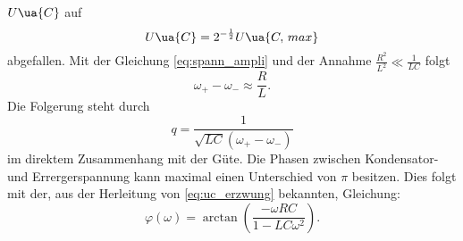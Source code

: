 $U\ua{C}$ auf
\begin{equation*}
   U\ua{C}=2^{-\frac{1}{2}} U\ua{C,\, max}
\end{equation*}
abgefallen.
Mit der Gleichung \eqref{eq:spann_ampli} und der Annahme $\frac{R^2}{L^2}\ll \frac{1}{LC}$
folgt
\begin{equation}
  \label{eq:omega_+_-}
  \omega_+-\omega_-\approx \frac{R}{L}.
\end{equation}
Die Folgerung steht durch %
\begin{equation*}
  q=\frac{1}{\sqrt{LC}\left(\omega_+-\omega_-\right)}
  \label{eq: resonanzüberhöhung}
\end{equation*}
im direktem Zusammenhang mit der Güte.
Die Phasen zwischen Kondensator- und Errergerspannung kann maximal
einen Unterschied von $\pi$ besitzen. Dies folgt mit der, aus der
Herleitung von \eqref{eq:uc_erzwung} bekannten, Gleichung:
\begin{equation}
  \label{eq:phase}
  \varphi(\omega)=\arctan\left(\frac{-\omega RC}{1-LC\omega^2}\right).
\end{equation}

